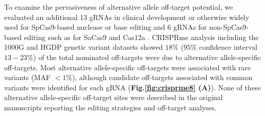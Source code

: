 \documentclass[a4paper, titlepage, openright]{book}
\begin{document}
To examine the pervasiveness of alternative allele off-target potential, we evaluated an additional 13 gRNAs in clinical development or otherwise widely used for SpCas9-based nuclease or base editing \citep{xu2017crispr,xu2019crispr,stadtmauer2020crispr,gillmore2021crispr,dewitt2016selection,xu2019editing,metais2019genome,tsai2015guide,zeng2020therapeutic,musunuru2021vivo} and 6 gRNAs for non-SpCas9-based editing such as for SaCas9 and Cas12a \citep{xu2019editing,chu2021rationally,newby2021base,maeder2019development,de2019edit}. CRISPRme analysis including the 1000G and HGDP genetic variant datasets showed $18\%$ ($95\%$ confidence interval $13-23\%$) of the total nominated off-targets were due to alternative allele-specific off-targets. Most alternative allele-specific off-targets were associated with rare variants (MAF $< 1\%$), although candidate off-targets associated with common variants were identified for each gRNA (\textbf{Fig.\ref{fig:crisprme8} (A)}). None of these alternative allele-specific off-target sites were described in the original manuscripts reporting the editing strategies and off-target analyses. 
\end{document}
